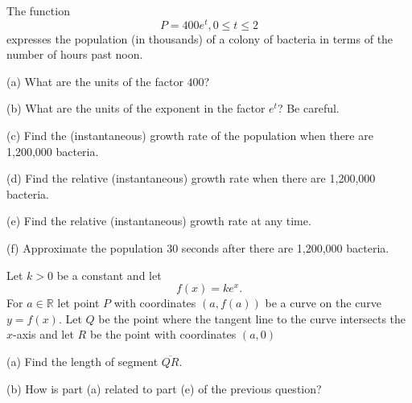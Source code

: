 \documentclass{ximera}
\begin{document}
\begin{question}  \label{Qdefrt4trt}
The function 
\[
    P = 400 e^t , 0\leq t \leq 2
\]
expresses the population (in thousands) of a colony of bacteria in terms of the number of hours past noon.

(a) What are the units of the factor $400$?

(b) What are the units of the exponent in the factor $e^t$? Be careful.

(c) Find the (instantaneous) growth rate of the population when there are 1,200,000 bacteria.

(d) Find the relative (instantaneous) growth rate when there are 1,200,000 bacteria.

(e) Find the  relative (instantaneous) growth rate at any time.

(f) Approximate the population $30$ seconds after there are 1,200,000 bacteria.
\end{question}


\begin{question}  \label{Qdfdsf4thn}
Let $k>0$ be a constant and let
\[
     f(x) = k e^x .
\]
For $a\in \mathbb{R}$ let point $P$ with coordinates $(a, f(a))$ be a curve on the curve $y=f(x)$. Let $Q$ be the point where the tangent line to the curve intersects the $x$-axis and let $R$ be the point with coordinates $(a,0)$

(a) Find the length of segment $\overline{QR}$.

(b) How is part (a) related to part (e) of the previous question?

\end{question}
\end{document}

